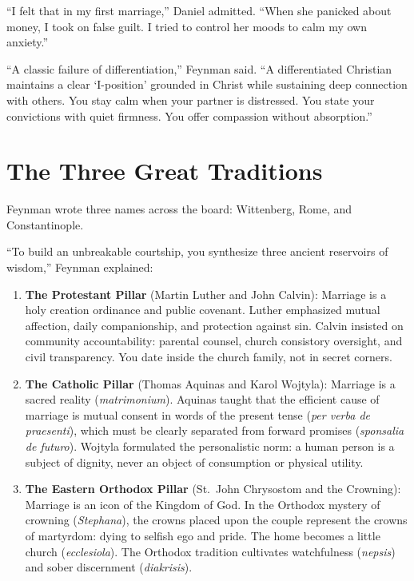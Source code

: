 \documentclass[11pt]{report}
\begin{document}
``I felt that in my first marriage,'' Daniel admitted. ``When she panicked about money, I took on false guilt. I tried to control her moods to calm my own anxiety.''

``A classic failure of differentiation,'' Feynman said. ``A differentiated Christian maintains a clear `I-position' grounded in Christ while sustaining deep connection with others. You stay calm when your partner is distressed. You state your convictions with quiet firmness. You offer compassion without absorption.''

\section{The Three Great Traditions}
Feynman wrote three names across the board: Wittenberg, Rome, and Constantinople.

``To build an unbreakable courtship, you synthesize three ancient reservoirs of wisdom,'' Feynman explained:
\begin{enumerate}
    \item \textbf{The Protestant Pillar} (Martin Luther and John Calvin): Marriage is a holy creation ordinance and public covenant. Luther emphasized mutual affection, daily companionship, and protection against sin. Calvin insisted on community accountability: parental counsel, church consistory oversight, and civil transparency. You date inside the church family, not in secret corners.
    \item \textbf{The Catholic Pillar} (Thomas Aquinas and Karol Wojtyla): Marriage is a sacred reality (\textit{matrimonium}). Aquinas taught that the efficient cause of marriage is mutual consent in words of the present tense (\textit{per verba de praesenti}), which must be clearly separated from forward promises (\textit{sponsalia de futuro}). Wojtyla formulated the personalistic norm: a human person is a subject of dignity, never an object of consumption or physical utility.
    \item \textbf{The Eastern Orthodox Pillar} (St.~John Chrysostom and the Crowning): Marriage is an icon of the Kingdom of God. In the Orthodox mystery of crowning (\textit{Stephana}), the crowns placed upon the couple represent the crowns of martyrdom: dying to selfish ego and pride. The home becomes a little church (\textit{ecclesiola}). The Orthodox tradition cultivates watchfulness (\textit{nepsis}) and sober discernment (\textit{diakrisis}).
\end{enumerate}
\end{document}
